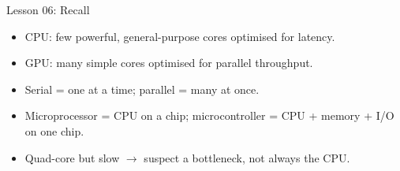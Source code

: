 \documentclass[aspectratio=169]{beamer}
\begin{document}
\begin{frame}{Lesson 06: Recall}
  \begin{itemize}
    \item CPU: few powerful, general-purpose cores optimised for latency.
    \item GPU: many simple cores optimised for parallel throughput.
    \item Serial = one at a time; parallel = many at once.
    \item Microprocessor = CPU on a chip; microcontroller = CPU + memory +
      I/O on one chip.
    \item Quad-core but slow $\rightarrow$ suspect a bottleneck, not always
      the CPU.
  \end{itemize}
\end{frame}
\end{document}
